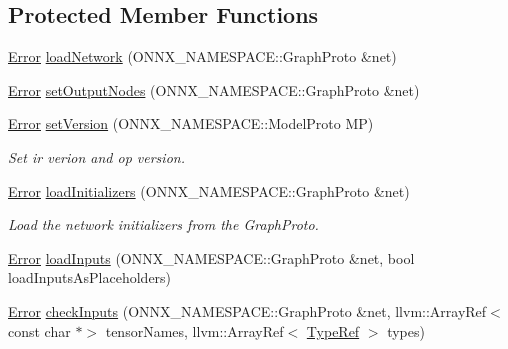 \subsection*{Protected Member Functions}
\begin{DoxyCompactItemize}
\item 
\hyperlink{namespaceglow_afdb176c3a672ef66db0ecfc19a8d39bf}{Error} \hyperlink{classglow_1_1_o_n_n_x_model_loader_a58b2261b6839659a524fe1c60da69a57}{load\+Network} (O\+N\+N\+X\+\_\+\+N\+A\+M\+E\+S\+P\+A\+C\+E\+::\+Graph\+Proto \&net)
\item 
\hyperlink{namespaceglow_afdb176c3a672ef66db0ecfc19a8d39bf}{Error} \hyperlink{classglow_1_1_o_n_n_x_model_loader_ad27874fc7944a1514d1c0366edf432cf}{set\+Output\+Nodes} (O\+N\+N\+X\+\_\+\+N\+A\+M\+E\+S\+P\+A\+C\+E\+::\+Graph\+Proto \&net)
\item 
\mbox{\label{classglow_1_1_o_n_n_x_model_loader_a0badc8e4da10853ad2c8ca5ecdadefe8}} 
\hyperlink{namespaceglow_afdb176c3a672ef66db0ecfc19a8d39bf}{Error} \hyperlink{classglow_1_1_o_n_n_x_model_loader_a0badc8e4da10853ad2c8ca5ecdadefe8}{set\+Version} (O\+N\+N\+X\+\_\+\+N\+A\+M\+E\+S\+P\+A\+C\+E\+::\+Model\+Proto MP)
\begin{DoxyCompactList}\small\item\em Set ir verion and op version. \end{DoxyCompactList}\item 
\mbox{\label{classglow_1_1_o_n_n_x_model_loader_a2da72549e3a216548ec6537dde49defc}} 
\hyperlink{namespaceglow_afdb176c3a672ef66db0ecfc19a8d39bf}{Error} \hyperlink{classglow_1_1_o_n_n_x_model_loader_a2da72549e3a216548ec6537dde49defc}{load\+Initializers} (O\+N\+N\+X\+\_\+\+N\+A\+M\+E\+S\+P\+A\+C\+E\+::\+Graph\+Proto \&net)
\begin{DoxyCompactList}\small\item\em Load the network initializers from the Graph\+Proto. \end{DoxyCompactList}\item 
\hyperlink{namespaceglow_afdb176c3a672ef66db0ecfc19a8d39bf}{Error} \hyperlink{classglow_1_1_o_n_n_x_model_loader_a058a0e98fd1cc21e4c092ddb4857969b}{load\+Inputs} (O\+N\+N\+X\+\_\+\+N\+A\+M\+E\+S\+P\+A\+C\+E\+::\+Graph\+Proto \&net, bool load\+Inputs\+As\+Placeholders)
\item 
\hyperlink{namespaceglow_afdb176c3a672ef66db0ecfc19a8d39bf}{Error} \hyperlink{classglow_1_1_o_n_n_x_model_loader_a9e92db9b3c007ae25458a7cfc0d6523f}{check\+Inputs} (O\+N\+N\+X\+\_\+\+N\+A\+M\+E\+S\+P\+A\+C\+E\+::\+Graph\+Proto \&net, llvm\+::\+Array\+Ref$<$ const char $\ast$$>$ tensor\+Names, llvm\+::\+Array\+Ref$<$ \hyperlink{structglow_1_1_type}{Type\+Ref} $>$ types)
$$
\end{DoxyCompactItemize}
